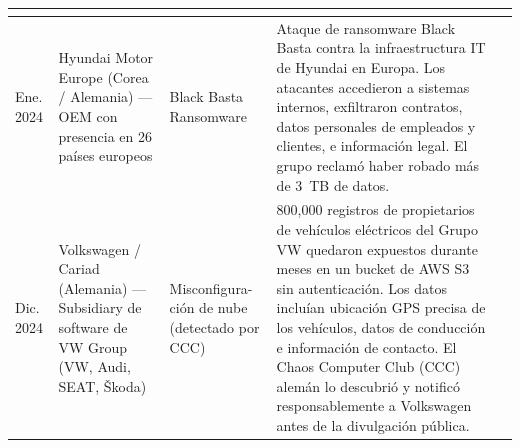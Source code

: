 \documentclass[letterpaper,11pt]{article}
\begin{document}
\begin{tabular}{|p{1.2cm}|p{2.5cm}|p{2.0cm}|p{5.5cm}|p{2.3cm}|}
  \autocite{toyota-disclosure-2023, reuters-toyota-2023} \\
\hline
Ene. 2024 &
  Hyundai Motor Europe (Corea / Alemania) --- OEM con presencia en 26 países europeos &
  Black Basta Ransomware &
  Ataque de ransomware Black Basta contra la infraestructura IT de Hyundai en Europa. Los atacantes accedieron a sistemas internos, exfiltraron contratos, datos personales de empleados y clientes, e información legal. El grupo reclamó haber robado más de 3~TB de datos. &
  \autocite{hyundai-blackbasta-2024} \\
\hline
Dic. 2024 &
  Volkswagen / Cariad (Alemania) --- Subsidiary de software de VW Group (VW, Audi, SEAT, Škoda) &
  Misconfigura-ción de nube (detectado por CCC) &
  800{,}000 registros de propietarios de vehículos eléctricos del Grupo VW quedaron expuestos durante meses en un bucket de AWS S3 sin autenticación. Los datos incluían ubicación GPS precisa de los vehículos, datos de conducción e información de contacto. El Chaos Computer Club (CCC) alemán lo descubrió y notificó responsablemente a Volkswagen antes de la divulgación pública. &
  \autocite{spiegel-vw-breach, securityweek-vw-breach} \\
\hline
\end{tabular}
\endgroup

\newpage
\thispagestyle{empty}

\nocite{*}
\printbibliography[heading=bibintoc, title={Referencias}]
\end{document}
